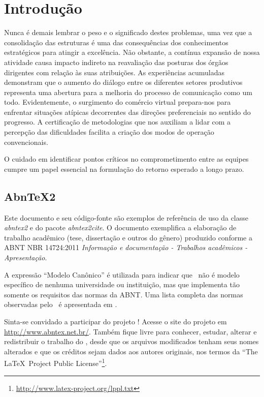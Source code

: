 \chapter{Introdução}

Nunca é demais lembrar o peso e o significado destes problemas, uma vez que a consolidação das estruturas é uma das consequências dos conhecimentos estratégicos para atingir a excelência. Não obstante, a contínua expansão de nossa atividade causa impacto indireto na reavaliação das posturas dos órgãos dirigentes com relação às suas atribuições. As experiências acumuladas demonstram que o aumento do diálogo entre os diferentes setores produtivos representa uma abertura para a melhoria do processo de comunicação como um todo. Evidentemente, o surgimento do comércio virtual prepara-nos para enfrentar situações atípicas decorrentes das direções preferenciais no sentido do progresso. A certificação de metodologias que nos auxiliam a lidar com a percepção das dificuldades facilita a criação dos modos de operação convencionais. 

O cuidado em identificar pontos críticos no comprometimento entre as equipes cumpre um papel essencial na formulação do retorno esperado a longo prazo.

\section{AbnTeX2}
Este documento e seu código-fonte são exemplos de referência de uso da classe
\emph{abntex2} e do pacote \emph{abntex2cite}. O documento 
exemplifica a elaboração de trabalho acadêmico (tese, dissertação e outros do
gênero) produzido conforme a ABNT NBR 14724:2011 \emph{Informação e documentação
- Trabalhos acadêmicos - Apresentação}.

A expressão ``Modelo Canônico'' é utilizada para indicar que \abnTeX\ não é
modelo específico de nenhuma universidade ou instituição, mas que implementa tão
somente os requisitos das normas da ABNT. Uma lista completa das normas
observadas pelo \abnTeX\ é apresentada em .

Sinta-se convidado a participar do projeto \abnTeX! Acesse o site do projeto em
\url{http://www.abntex.net.br/}. Também fique livre para conhecer,
estudar, alterar e redistribuir o trabalho do \abnTeX, desde que os arquivos
modificados tenham seus nomes alterados e que os créditos sejam dados aos
autores originais, nos termos da ``The \LaTeX\ Project Public
License''\footnote{\url{http://www.latex-project.org/lppl.txt}}.

